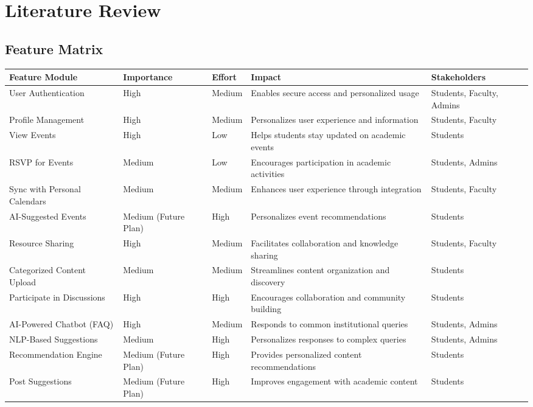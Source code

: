 \chapter{Literature Review}

\section{Feature Matrix}

\begin{longtable}{|L{4cm}|C{2.2cm}|C{2cm}|L{4cm}|L{3cm}|}
\hline
\textbf{Feature Module} & \textbf{Importance} & \textbf{Effort} & \textbf{Impact} & \textbf{Stakeholders} \\
\hline
User Authentication & High & Medium & Enables secure access and personalized usage & Students, Faculty, Admins \\
\hline
Profile Management & High & Medium & Personalizes user experience and information & Students, Faculty \\
\hline
View Events & High & Low & Helps students stay updated on academic events & Students \\
\hline
RSVP for Events & Medium & Low & Encourages participation in academic activities & Students, Admins \\
\hline
Sync with Personal Calendars & Medium & Medium & Enhances user experience through integration & Students, Faculty \\
\hline
AI-Suggested Events & Medium (Future Plan) & High & Personalizes event recommendations & Students \\
\hline
Resource Sharing & High & Medium & Facilitates collaboration and knowledge sharing & Students, Faculty \\
\hline
Categorized Content Upload & Medium & Medium & Streamlines content organization and discovery & Students \\
\hline
Participate in Discussions & High & High & Encourages collaboration and community building & Students \\
\hline
AI-Powered Chatbot (FAQ) & High & Medium & Responds to common institutional queries & Students, Admins \\
\hline
NLP-Based Suggestions & Medium & High & Personalizes responses to complex queries & Students, Admins \\
\hline
Recommendation Engine & Medium (Future Plan) & High & Provides personalized content recommendations & Students \\
\hline
Post Suggestions & Medium (Future Plan) & High & Improves engagement with academic content & Students \\

\end{longtable}
